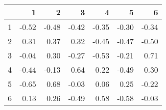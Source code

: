 \begin{table}[ht]
\centering
\begin{tabular}{rrrrrrr}
  \hline
 & 1 & 2 & 3 & 4 & 5 & 6 \\ 
  \hline
1 & -0.52 & -0.48 & -0.42 & -0.35 & -0.30 & -0.34 \\ 
  2 & 0.31 & 0.37 & 0.32 & -0.45 & -0.47 & -0.50 \\ 
  3 & -0.04 & 0.30 & -0.27 & -0.53 & -0.21 & 0.71 \\ 
  4 & -0.44 & -0.13 & 0.64 & 0.22 & -0.49 & 0.30 \\ 
  5 & -0.65 & 0.68 & -0.03 & 0.06 & 0.25 & -0.22 \\ 
  6 & 0.13 & 0.26 & -0.49 & 0.58 & -0.58 & -0.03 \\ 
   \hline
\end{tabular}
\end{table}
